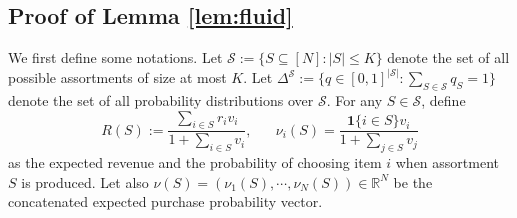 \documentclass[opre]{informs3aa}
\newcommand{\vct}{\boldsymbol }
\begin{document}
\begin{appendices}
	
\vspace{.2cm}

{
\section{Proof of Lemma \ref{lem:fluid}}
\label{app:fluid}

We first define some notations.
Let $\mathcal S := \{S\subseteq[N]: |S|\leq K\}$ denote the set of all possible assortments of size at most $K$.
Let $\Delta^{\mathcal S} := \{q\in[0,1]^{|\mathcal S|}: \sum_{S\in\mathcal S}q_S=1\}$ denote the set of all probability distributions over $\mathcal S$.
For any $S\in\mathcal S$, define
$$
R(S) := \frac{\sum_{i\in S}r_iv_i}{1+\sum_{i\in S}v_i}, \;\;\;\;\;\;\nu_i(S) = \frac{\vct 1\{i\in S\}v_i}{1+\sum_{j\in S} v_j}
$$
as the expected revenue and the probability of choosing item $i$ when assortment $S$ is produced.
Let also $\nu(S) = (\nu_1(S),\cdots,\nu_N(S))\in\mathbb R^N$ be the concatenated expected purchase probability vector.

}
\end{appendices}
\end{document}
